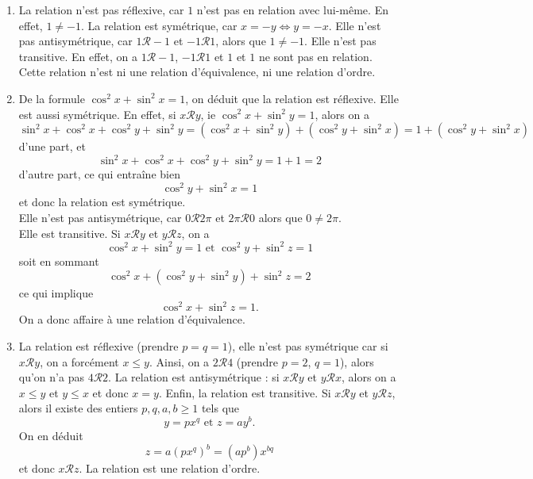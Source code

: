 \documentclass[11pt,a4paper]{article}
\begin{document}
	\begin{corrige}
		\begin{enumerate}
			
			\item  La relation n'est pas réflexive, car $1$ n'est pas en relation avec lui-même. En effet, $1\neq -1$.
			La relation est symétrique, car $x=-y\iff y=-x$. Elle n'est pas antisymétrique, car $1\mathcal R -1$ et
			$-1\mathcal R 1$, alors que $1\neq -1$. Elle n'est pas transitive. En effet, on a $1\mathcal R -1$, $-1\mathcal R 1$ et $1$ et $1$ ne sont pas en relation.
			Cette relation n'est ni une relation d'équivalence, ni une relation d'ordre.
			
			\item  De la formule $\cos^2 x+\sin^2 x=1$, on déduit que la relation est réflexive. Elle est aussi symétrique.
			En effet, si $x\mathcal R y$, ie $\cos^2 x+\sin^2 y=1$, alors on a
			$$\sin^2 x+\cos ^2 x+\cos ^2 y+\sin^2 y=(\cos^2 x+\sin^2 y)+(\cos^2 y+\sin^2 x)=1+(\cos^2 y+\sin^2 x)$$
			d'une part, et
			$$\sin^2 x+\cos ^2 x+\cos ^2 y+\sin^2 y=1+1=2$$
			d'autre part, ce qui entraîne bien 
			$$\cos^2 y+\sin^2 x=1$$
			et donc la relation est symétrique.\\
			
			Elle n'est pas antisymétrique, car $0\mathcal R 2\pi$ et $2\pi\mathcal R 0$ alors que $0\neq 2\pi$.\\
			
			Elle est transitive. Si $x\mathcal R y$ et $y\mathcal R z$, on a 
			$$\cos^2 x+\sin^2 y=1\textrm{ et }\cos^2 y+\sin^2 z=1$$
			soit en sommant
			$$\cos^2 x+(\cos^2 y+\sin^2 y)+\sin^2 z=2$$
			ce qui implique
			$$\cos^2 x+\sin^2 z=1.$$
			On a donc affaire à une relation d'équivalence.
			
			\item  La relation est réflexive (prendre $p=q=1$), elle n'est pas symétrique car si $x\mathcal R y$, on a 
			forcément $x\leq y$. Ainsi, on a $2\mathcal R 4$ (prendre $p=2$, $q=1$), alors qu'on n'a pas $4\mathcal R 2$.
			La relation est antisymétrique : si $x\mathcal R y$ et $y\mathcal R x$, alors on a
			$x\leq y$ et $y\leq x$ et donc $x=y$. Enfin, la relation est transitive. Si $x\mathcal R y$
			et $y\mathcal R z$, alors il existe des entiers $p,q,a,b\geq 1$ tels que
			$$y=px^q\textrm{ et }z=ay^b.$$
			On en déduit
			$$z=a(px^q)^b=(ap^b)x^{bq}$$
			et donc $x\mathcal R z$. La relation est une relation d'ordre.
			
		\end{enumerate}
	\end{corrige}
	
\end{document}
